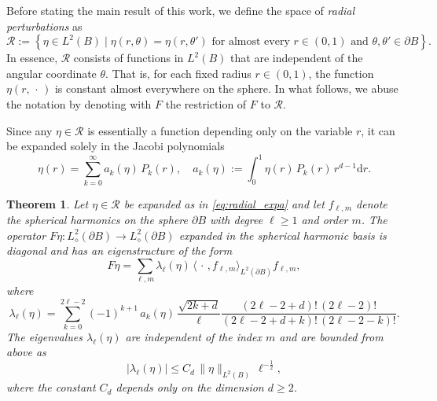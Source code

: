 \documentclass[reqno]{amsart}
\numberwithin{equation}{section}
\numberwithin{figure}{section}
\numberwithin{table}{section}
\theoremstyle{plain}
\newtheorem{theorem}{Theorem}[section]
\theoremstyle{definition}
\theoremstyle{remark}
\newcommand{\abs}[1]{\lvert#1\rvert}
\newcommand{\inner}[1]{\langle#1\rangle}
\newcommand{\di}{\mathrm{d}}   %
\newcommand{\sphe}{{\partial B}}
\begin{document}
Before stating the main result of this work, we define the space of \emph{radial perturbations} as
%
\begin{equation} \label{eq:space_of_eta}
    \mathcal{R} := \left\{ \eta \in L^2(B) \mid \eta(r, \theta) = \eta(r, \theta') \text{ for almost every } r \in (0, 1) \text{ and } \theta, \theta' \in \sphe \right\}.
\end{equation}
%
In essence, \( \mathcal{R} \) consists of functions in \( L^2(B) \) that are independent of the angular coordinate \( \theta \). 
%
That is, for each fixed radius \( r \in (0, 1) \), the function \( \eta(r,\,\cdot\,) \) is constant almost everywhere on the sphere.
%
In what follows, we abuse the notation by denoting with \( F \) the restriction of \( F \) to \( \mathcal{R} \).
%


Since any \( \eta \in \mathcal{R} \) is essentially a function depending only on the variable \( r \), it can be expanded solely in the Jacobi polynomials
%
\begin{equation} \label{eq:radial_expa}
    \eta(r) = \sum^\infty_{k=0} a_k(\eta) \, P_k(r), \quad a_k(\eta) := \int^1_0 \eta(r) \, P_k(r) \, r^{d-1} \di r.
\end{equation}
%


%
\begin{theorem} \label{main_thm}
    Let \( \eta \in \mathcal{R} \) be expanded as in \eqref{eq:radial_expa} and let \( f_{\ell,m} \) denote the spherical harmonics on the sphere \( \sphe \) with degree \( \ell \geq 1 \) and order \( m \).
    The operator \( F \eta : L^2_\diamond(\sphe) \to L^2_\diamond(\sphe) \) expanded in the spherical harmonic basis is diagonal and has an eigenstructure of the form
    \begin{equation}
        F \eta = \sum_{\ell, m} \lambda_\ell(\eta) \, \inner{\,\cdot\,, f_{\ell, m}}_{L^2(\sphe)} f_{\ell, m},
    \end{equation}
    where
    \begin{equation*}
        \lambda_\ell(\eta) = \sum^{2 \ell - 2}_{k=0} (-1)^{k+1} \, a_k(\eta) \, \frac{\sqrt{2k+d}}{\ell} \frac{(2\ell-2+d)! \, (2\ell-2)!}{(2\ell-2+d+k)! \, (2\ell-2-k)!}.
    \end{equation*}
    The eigenvalues \( \lambda_\ell(\eta) \) are independent of the index \( m \) and are bounded from above as
    \begin{equation}
        \abs{\lambda_\ell(\eta)} \leq C_d \, \| \eta \|_{L^2(B)} \, \ell^{-\frac{1}{2}},
    \end{equation}
    where the constant \( C_d \) depends only on the dimension \( d \geq 2 \).
\end{theorem}
%
\end{document}
